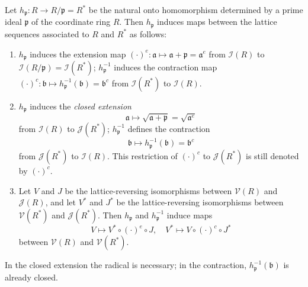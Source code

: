 Let $h_{\mathfrak{p}} : R \to R/\mathfrak{p} = R^*$ be the natural onto homomorphism determined by a prime ideal $\mathfrak{p}$ of the coordinate ring $R$. Then $h_{\mathfrak{p}}$ induces maps between the lattice sequences associated to $R$ and $R^*$ as follows:

\begin{enumerate}
\item[(a)] $h_{\mathfrak{p}}$ induces the extension map $(\cdot)^e : \mathfrak{a} \mapsto \mathfrak{a} + \mathfrak{p} = \mathfrak{a}^e$ from $\mathcal{I}(R)$ to $\mathcal{I}(R/\mathfrak{p}) = \mathcal{I}(R^*)$; $h_{\mathfrak{p}}^{-1}$ induces the contraction map $(\cdot)^c : \mathfrak{b} \mapsto h_{\mathfrak{p}}^{-1}(\mathfrak{b}) = \mathfrak{b}^c$ from $\mathcal{I}(R^*)$ to $\mathcal{I}(R)$.

\item[(b)] $h_{\mathfrak{p}}$ induces the \textit{closed extension}
$$\mathfrak{a} \mapsto \sqrt{\mathfrak{a} + \mathfrak{p}} = \sqrt{\mathfrak{a}^e}$$
from $\mathcal{I}(R)$ to $\mathcal{J}(R^*)$; $h_{\mathfrak{p}}^{-1}$ defines the contraction
$$\mathfrak{b} \mapsto h_{\mathfrak{p}}^{-1}(\mathfrak{b}) = \mathfrak{b}^c$$
from $\mathcal{J}(R^*)$ to $\mathcal{I}(R)$. This restriction of $(\cdot)^c$ to $\mathcal{J}(R^*)$ is still denoted by $(\cdot)^c$.

\item[(c)] Let $V$ and $J$ be the lattice-reversing isomorphisms between $\mathcal{V}(R)$ and $\mathcal{J}(R)$, and let $V^*$ and $J^*$ be the lattice-reversing isomorphisms between $\mathcal{V}(R^*)$ and $\mathcal{J}(R^*)$. Then $h_{\mathfrak{p}}$ and $h_{\mathfrak{p}}^{-1}$ induce maps
$$V \mapsto V^* \circ (\cdot)^e \circ J, \quad V^* \mapsto V \circ (\cdot)^c \circ J^*$$
between $\mathcal{V}(R)$ and $\mathcal{V}(R^*)$.
\end{enumerate}

In the closed extension the radical is necessary; in the contraction, $h_{\mathfrak{p}}^{-1}(\mathfrak{b})$ is already closed.
